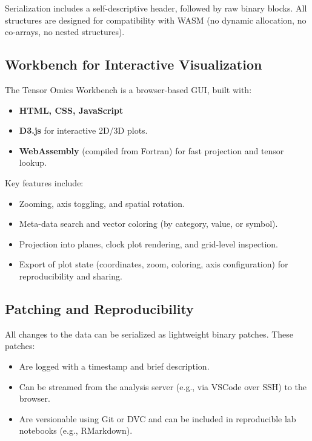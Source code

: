 \documentclass[11pt]{article}
\begin{document}
Serialization includes a self-descriptive header, followed by raw binary blocks. All structures are designed for compatibility with WASM (no dynamic allocation, no co-arrays, no nested structures).

\subsection{Workbench for Interactive Visualization}

The Tensor Omics Workbench is a browser-based GUI, built with:

\begin{itemize}[leftmargin=1.5em]
    \item \textbf{HTML, CSS, JavaScript}
    \item \textbf{D3.js} for interactive 2D/3D plots.
    \item \textbf{WebAssembly} (compiled from Fortran) for fast projection and tensor lookup.
\end{itemize}

Key features include:
\begin{itemize}[leftmargin=1.5em]
    \item Zooming, axis toggling, and spatial rotation.
    \item Meta-data search and vector coloring (by category, value, or symbol).
    \item Projection into planes, clock plot rendering, and grid-level inspection.
    \item Export of plot state (coordinates, zoom, coloring, axis configuration) for reproducibility and sharing.
\end{itemize}

\subsection{Patching and Reproducibility}

All changes to the data can be serialized as lightweight binary patches. These patches:
\begin{itemize}[leftmargin=1.5em]
    \item Are logged with a timestamp and brief description.
    \item Can be streamed from the analysis server (e.g., via VSCode over SSH) to the browser.
    \item Are versionable using Git or DVC and can be included in reproducible lab notebooks (e.g., RMarkdown).
\end{itemize}
\end{document}
